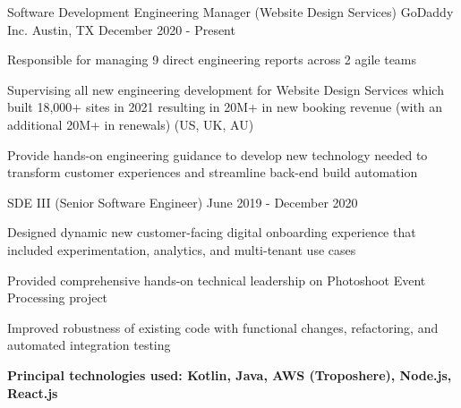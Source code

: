 

\begin{cventries}

  \cventry
    {Software Development Engineering Manager (Website Design Services)} %
    {GoDaddy Inc.} %
    {Austin, TX} %
    {December 2020 - Present} %
    {
      \begin{cvitems} %
        \item {Responsible for managing 9 direct engineering reports across 2 agile teams}
        \item {Supervising all new engineering development for Website Design Services which built 18,000+ sites in 2021 resulting in 20M+ in new booking revenue (with an additional 20M+ in renewals) (US, UK, AU)}
        \item {Provide hands-on engineering guidance to develop new technology needed to transform customer experiences and
streamline back-end build automation}
      \end{cvitems}
    }

  \cventry
    {SDE III (Senior Software Engineer)} %
    {} %
    {} %
    {June 2019 - December 2020} %
    {
      \begin{cvitems} %
              \item {Designed dynamic new customer-facing digital onboarding experience that included experimentation, analytics, and multi-tenant use cases}
        \item {Provided comprehensive hands-on technical leadership on Photoshoot Event Processing project}
        \item {Improved robustness of existing code with functional changes, refactoring, and automated integration testing}
        \item {\textbf{Principal technologies used: Kotlin, Java, AWS (Troposhere), Node.js, React.js}}
      \end{cvitems}
    }


\end{cventries}
